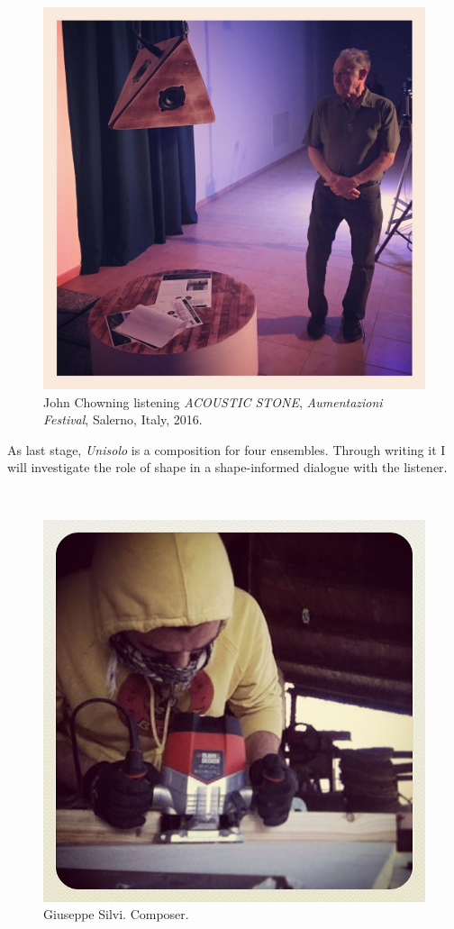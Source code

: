 \documentclass[
	12pt,
	a4paper,
	twocolumn
	]{article}
\begin{document}
\begin{figure}[htbp]
\begin{center}
\includegraphics[width=.47\textwidth]{img/14597413_1128159647252783_1502048594255937536_n.jpg}
\caption{John Chowning listening \emph{ACOUSTIC STONE}, \emph{Aumentazioni Festival}, Salerno, Italy, 2016.}
\label{stone2}
\end{center}
\end{figure}


As last stage, \emph{Unisolo} is a composition for four ensembles. Through writing it I will investigate the role of shape in a shape-informed dialogue with the listener. 




~

\vfill

\begin{figure}[htbp]
\centering
\includegraphics[width=.47\textwidth]{img/927576_1422938657945799_34474354_n}
\caption{Giuseppe Silvi. Composer.}
\label{conc}
\end{figure}
\end{document}

